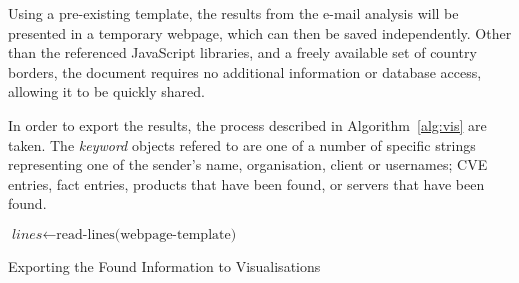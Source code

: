 Using a pre-existing template, the results from the e-mail analysis will be
presented in a temporary webpage, which can then be saved independently.  Other
than the referenced JavaScript libraries, and a freely available set of country 
borders, the document requires no additional information or database access, 
allowing it to be quickly shared.

In order to export the results, the process described in Algorithm~\ref{alg:vis} are taken.  The \textit{keyword} objects refered to are one of a number of specific strings representing one of the sender's name, organisation, client or usernames; CVE entries, fact entries, products that have been found, or servers that have been found.

\begin{algorithm}
	$\textit{lines}\gets\text{read-lines(webpage-template)}$\;
	\;
	\caption{Exporting the Found Information to Visualisations}
	\label{alg:vis}
\end{algorithm}
